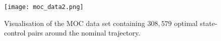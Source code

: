 \documentclass[graybox]{svmult}
\begin{document}






\begin{figure}[t]
\sidecaption
\texttt{[image: moc\_data2.png]}
\caption{Visualisation of the MOC data set containing $308,579$ optimal state-control pairs around the nominal trajectory.}
\label{fig:wholedata}
\end{figure}
\end{document}
